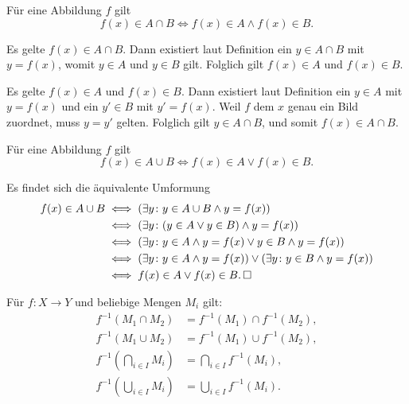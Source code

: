 \begin{Satz} Für eine Abbildung $f$ gilt
\[f(x)\in A\cap B\iff f(x)\in A\land f(x)\in B.\]
\end{Satz}
\begin{Beweis}
Es gelte $f(x)\in A\cap B$. Dann existiert laut Definition ein
$y\in A\cap B$ mit $y=f(x)$, womit $y\in A$ und $y\in B$ gilt.
Folglich gilt $f(x)\in A$ und $f(x)\in B$.

Es gelte $f(x)\in A$ und $f(x)\in B$. Dann existiert laut Definition
ein $y\in A$ mit $y=f(x)$ und ein $y'\in B$ mit $y'=f(x)$.
Weil $f$ dem $x$ genau ein Bild zuordnet, muss $y=y'$ gelten.
Folglich gilt $y\in A\cap B$, und somit $f(x)\in A\cap B$.\,\qedsymbol
\end{Beweis}

\begin{Satz} Für eine Abbildung $f$ gilt
\[f(x)\in A\cup B\iff f(x)\in A\lor f(x)\in B.\]
\end{Satz}
\begin{Beweis} Es findet sich die äquivalente Umformung
\begin{align*}
f(x)\in A\cup B &\iff (\exists y\colon y\in A\cup B\land y=f(x))\\
&\iff (\exists y\colon (y\in A\lor y\in B)\land y = f(x))\\
&\iff (\exists y\colon y\in A\land y=f(x)\lor y\in B\land y = f(x))\\
&\iff (\exists y\colon y\in A\land y=f(x))\lor (\exists y\colon y\in B\land y = f(x))\\
&\iff f(x)\in A\lor f(x)\in B.\,\square
\end{align*}
\end{Beweis}

\begin{Satz}%
\label{preimg-dl}\newlinefirst
Für $f\colon X\to Y$ und beliebige Mengen $M_i$ gilt:%
\begin{align}
f^{-1}(M_1\cap M_2) &= f^{-1}(M_1)\cap f^{-1}(M_2),\\
f^{-1}(M_1\cup M_2) &= f^{-1}(M_1)\cup f^{-1}(M_2),\\
f^{-1}(\bigcap_{i\in I} M_i) &= \bigcap_{i\in I} f^{-1}(M_i),\\
f^{-1}(\bigcup_{i\in I} M_i) &= \bigcup_{i\in I} f^{-1}(M_i).
\end{align}
\end{Satz}

